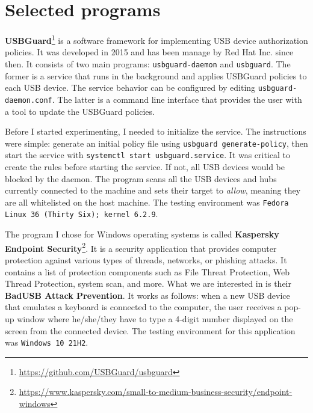 \section{Selected programs}
\label{sec:defense_selected_programs}
\textbf{USBGuard}\footnote{\url{https://github.com/USBGuard/usbguard}} is a software framework for implementing USB device authorization policies. It was developed in 2015 and has been manage by Red Hat Inc. since then. It consists of two main programs: \verb|usbguard-daemon| and \verb|usbguard|. The former is a service that runs in the background and applies USBGuard policies to each USB device. The service behavior can be configured by editing \verb|usbguard-daemon.conf|. The latter is a command line interface that provides the user with a tool to update the USBGuard policies.

Before I started experimenting, I needed to initialize the service. The instructions were simple: generate an initial policy file using \verb|usbguard generate-policy|, then start the service with \verb|systemctl start usbguard.service|. It was critical to create the rules before starting the service. If not, all USB devices would be blocked by the daemon. The program scans all the USB devices and hubs currently connected to the machine and sets their target to \emph{allow}, meaning they are all whitelisted on the host machine. The testing environment was \verb|Fedora Linux 36 (Thirty Six); kernel 6.2.9|.

The program I chose for Windows operating systems is called \textbf{Kaspersky Endpoint Security}\footnote{\url{https://www.kaspersky.com/small-to-medium-business-security/endpoint-windows}}. It is a security application that provides computer protection against various types of threads, networks, or phishing attacks. It contains a list of protection components such as File Threat Protection, Web Thread Protection, system scan, and more. What we are interested in is their \textbf{BadUSB Attack Prevention}. It works as follows: when a new USB device that emulates a keyboard is connected to the computer, the user receives a pop-up window where he/she/they have to type a 4-digit number displayed on the screen from the connected device. The testing environment for this application was \verb|Windows 10 21H2|.

